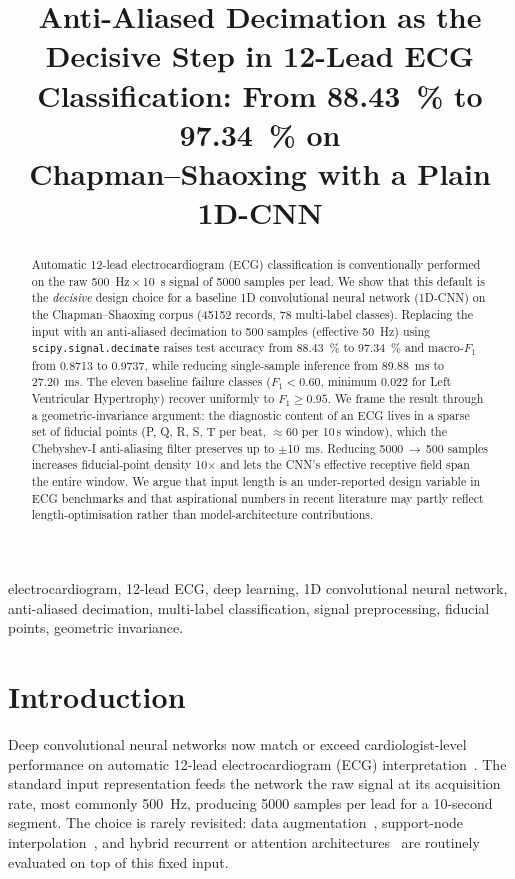 \documentclass[conference]{IEEEtran}
\title{Anti-Aliased Decimation as the Decisive Step in 12-Lead ECG \\
       Classification: From \SI{88.43}{\percent} to \SI{97.34}{\percent} on \\
       Chapman--Shaoxing with a Plain 1D-CNN}
\author{\IEEEauthorblockN{Elaman Nazarkulov}
\IEEEauthorblockA{Department of Computer Engineering \\
Kyrgyz--Turkish Manas University \\
Bishkek, Kyrgyzstan \\
elaman.job@gmail.com}}
\begin{document}
\maketitle

\begin{abstract}
Automatic 12-lead electrocardiogram (ECG) classification is conventionally
performed on the raw \SI{500}{\hertz}\,$\times$\,\SI{10}{\second} signal of
\num{5000} samples per lead. We show that this default is the
\emph{decisive} design choice for a baseline 1D convolutional neural
network (1D-CNN) on the Chapman--Shaoxing corpus (\num{45152} records,
\num{78} multi-label classes). Replacing the input with an anti-aliased
decimation to \num{500} samples (effective \SI{50}{\hertz}) using
\texttt{scipy.signal.decimate} raises test accuracy from
\SI{88.43}{\percent} to \SI{97.34}{\percent} and macro-$F_1$ from
\num{0.8713} to \num{0.9737}, while reducing single-sample inference from
\SI{89.88}{\milli\second} to \SI{27.20}{\milli\second}. The eleven baseline
failure classes ($F_1<0.60$, minimum \num{0.022} for Left Ventricular
Hypertrophy) recover uniformly to $F_1\geq 0.95$. We frame the result
through a geometric-invariance argument: the diagnostic content of an ECG
lives in a sparse set of fiducial points (P, Q, R, S, T per beat,
$\approx \num{60}$ per 10\,s window), which the Chebyshev-I
anti-aliasing filter preserves up to $\pm$\SI{10}{\milli\second}.
Reducing 5000\,$\rightarrow$\,500 samples increases fiducial-point
density 10$\times$ and lets the CNN's effective receptive field span
the entire window. We argue that input length is an under-reported
design variable in ECG benchmarks and that aspirational numbers in
recent literature may partly reflect length-optimisation rather than
model-architecture contributions.
\end{abstract}

\begin{IEEEkeywords}
electrocardiogram, 12-lead ECG, deep learning, 1D convolutional neural
network, anti-aliased decimation, multi-label classification, signal
preprocessing, fiducial points, geometric invariance.
\end{IEEEkeywords}

\section{Introduction}
Deep convolutional neural networks now match or exceed cardiologist-level
performance on automatic 12-lead electrocardiogram (ECG)
interpretation~\cite{rajpurkar2017,hannun2019,strodthoff2020}.
The standard input representation feeds the network the raw signal at its
acquisition rate, most commonly \SI{500}{\hertz}, producing \num{5000}
samples per lead for a 10-second segment. The choice is rarely
revisited: data augmentation~\cite{iwana2021,wang2020}, support-node
interpolation~\cite{chen2021,xu2022}, and hybrid recurrent or attention
architectures~\cite{oh2018,strodthoff2020} are routinely evaluated on
top of this fixed input.
\end{document}
